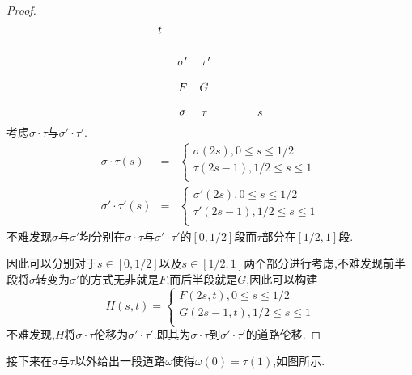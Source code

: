 \documentclass{article}
\begin{document}
\begin{proof}
\[\begin{tikzpicture}[x=0.75pt,y=0.75pt,yscale=-1,xscale=1]
    \draw (84,18.4) node [anchor=north west][inner sep=0.75pt]    {$t$};
    \draw (201.11,118.4) node [anchor=north west][inner sep=0.75pt]    {$s$};
    \draw (107,54.4) node [anchor=north west][inner sep=0.75pt]    {$\sigma '$};
    \draw (135,54.4) node [anchor=north west][inner sep=0.75pt]    {$\tau '$};
    \draw (109,117.4) node [anchor=north west][inner sep=0.75pt]    {$\sigma $};
    \draw (135,118.4) node [anchor=north west][inner sep=0.75pt]    {$\tau $};
    \draw (108,85.4) node [anchor=north west][inner sep=0.75pt]    {$F$};
    \draw (133,85.4) node [anchor=north west][inner sep=0.75pt]    {$G$}; 
    \end{tikzpicture}\]    
    考虑$\sigma \cdot \tau$与$\sigma' \cdot \tau'$.
    \begin{eqnarray*}
        \sigma \cdot \tau(s) &=& \left\{
        \begin{array}{c}
        \sigma(2s), 0 \leq s \leq 1/2\\
        \tau(2s-1), 1/2 \leq s \leq 1\\
        \end{array}
        \right.\\
        \sigma' \cdot \tau'(s) &=& \left\{
        \begin{array}{c}
        \sigma'(2s), 0 \leq s \leq 1/2\\
        \tau'(2s-1), 1/2 \leq s \leq 1\\
        \end{array}
        \right.
    \end{eqnarray*}
    不难发现$\sigma$与$\sigma'$均分别在$\sigma \cdot \tau$与$\sigma' \cdot \tau'$的$[0,1/2]$段而$\tau$部分在$[1/2,1]$段.


    因此可以分别对于$s \in [0,1/2]$以及$s \in [1/2,1]$两个部分进行考虑,不难发现前半段将$\sigma$转变为$\sigma'$的方式无非就是$F$,而后半段就是$G$,因此可以构建
    $$
    H(s,t) = \left\{
\begin{array}{c}
    F(2s,t),0\leq s \leq 1/2\\
    G(2s-1,t),1/2 \leq s \leq 1\\
\end{array}
    \right.
    $$
    不难发现,$H$将$\sigma \cdot \tau$伦移为$\sigma' \cdot \tau'$.即其为$\sigma \cdot \tau$到$\sigma' \cdot \tau'$的道路伦移.
\end{proof}
接下来在$\sigma$与$\tau$以外给出一段道路$\omega$使得$\omega(0) = \tau(1)$,如图所示.
\end{document}
